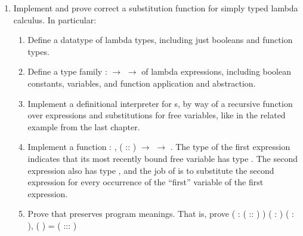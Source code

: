 \documentclass[12pt]{report}
\begin{document}
 \begin{enumerate}


\item Implement and prove correct a substitution function for simply typed lambda calculus.  In particular:
\begin{enumerate}
  \item Define a datatype  of lambda types, including just booleans and function types.
  \item Define a type family  :   \ensuremath{\rightarrow}  \ensuremath{\rightarrow}  of lambda expressions, including boolean constants, variables, and function application and abstraction.
  \item Implement a definitional interpreter for s, by way of a recursive function over expressions and substitutions for free variables, like in the related example from the last chapter.
  \item Implement a function  : \coqdockw{\ensuremath{\forall}}   ,  ( :: )  \ensuremath{\rightarrow}    \ensuremath{\rightarrow}   .  The type of the first expression indicates that its most recently bound free variable has type .  The second expression also has type , and the job of  is to substitute the second expression for every occurrence of the ``first'' variable of the first expression.
  \item Prove that  preserves program meanings.  That is, prove
  \coqdoceol
\coqdocemptyline
\coqdocnoindent
\coqdockw{\ensuremath{\forall}}    ( :  ( :: ) ) ( :   ) ( :   ),\coqdoceol
\coqdocindent{1.00em}
 (  )  =   (   ::: )


\end{enumerate}
\end{enumerate}
\end{document}
